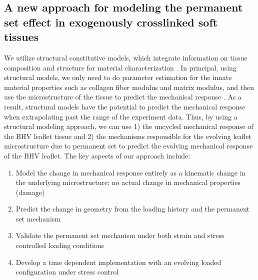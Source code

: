 \subsection{A new approach for modeling the permanent set effect in exogenously crosslinked soft tissues}

	We utilize structural constitutive models, which integrate information on tissue composition and structure for material characterization \cite{sacks_structural_2000}. 
	In principal, using structural models, we only need to do parameter estimation for the innate material properties such as collagen fiber modulus and matrix modulus, and then use the microstructure of the tissue to predict the mechanical response \cite{zhang_meso_2016, fata_insights_2014}. 
	As a result, structural models have the potential to predict the mechanical response when extrapolating past the range of the experiment data.
	Thus, by using a structural modeling approach, we can use 1) the uncycled mechanical response of the BHV leaflet tissue and 2) the mechanisms responsible for the evolving leaflet microstructure due to permanent set to predict the evolving mechanical response of the BHV leaflet. The key aspects of our approach include:
\begin{enumerate}
\item Model the change in mechanical response entirely as a kinematic change in the underlying microstructure; no actual change in mechanical properties (damage)
\item Predict the change in geometry from the loading history and the permanent set mechanism
\item Validate the permanent set mechanism under both strain and stress controlled loading conditions
\item Develop a time dependent implementation with an evolving loaded configuration under stress control
\end{enumerate}